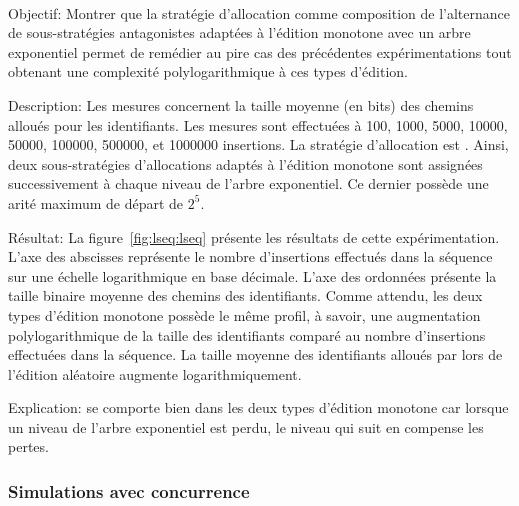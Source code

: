 \ \\

\begin{asparadesc}
\item [Objectif:] Montrer que la stratégie d'allocation \LSEQ comme composition
  de l'alternance de sous-stratégies antagonistes adaptées à l'édition monotone
  avec un arbre exponentiel permet de remédier au pire cas des précédentes
  expérimentations tout obtenant une complexité polylogarithmique à ces types
  d'édition.
\item [Description:] Les mesures concernent la taille moyenne (en bits) des
  chemins alloués pour les identifiants. Les mesures sont effectuées à 100,
  1000, 5000, 10000, 50000, 100000, 500000, et 1000000 insertions. La stratégie
  d'allocation est \LSEQ. Ainsi, deux sous-stratégies d'allocations adaptés à
  l'édition monotone sont assignées successivement à chaque niveau de l'arbre
  exponentiel. Ce dernier possède une arité maximum de départ de $2^5$.
\item [Résultat:] La figure~\ref{fig:lseq:lseq} présente les résultats de cette
  expérimentation. L'axe des abscisses représente le nombre d'insertions
  effectués dans la séquence sur une échelle logarithmique en base
  décimale. L'axe des ordonnées présente la taille binaire moyenne des chemins
  des identifiants. Comme attendu, les deux types d'édition monotone possède le
  même profil, à savoir, une augmentation polylogarithmique de la taille des
  identifiants comparé au nombre d'insertions effectuées dans la séquence. La
  taille moyenne des identifiants alloués par \LSEQ lors de l'édition aléatoire
  augmente logarithmiquement.
\item [Explication:] \LSEQ se comporte bien dans les deux types d'édition
  monotone car lorsque un niveau de l'arbre exponentiel est perdu, le niveau
  qui suit en compense les pertes.
\end{asparadesc}

\subsubsection{Simulations avec concurrence}

